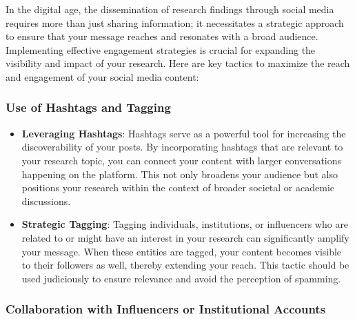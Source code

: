 \documentclass[
]{book}
\begin{document}
In the digital age, the dissemination of research findings through social media requires more than just sharing information; it necessitates a strategic approach to ensure that your message reaches and resonates with a broad audience. Implementing effective engagement strategies is crucial for expanding the visibility and impact of your research. Here are key tactics to maximize the reach and engagement of your social media content:

\hypertarget{use-of-hashtags-and-tagging}{%
\subsubsection*{Use of Hashtags and Tagging}\label{use-of-hashtags-and-tagging}}

\begin{itemize}
\item
  \textbf{Leveraging Hashtags}: Hashtags serve as a powerful tool for increasing the discoverability of your posts. By incorporating hashtags that are relevant to your research topic, you can connect your content with larger conversations happening on the platform. This not only broadens your audience but also positions your research within the context of broader societal or academic discussions.
\item
  \textbf{Strategic Tagging}: Tagging individuals, institutions, or influencers who are related to or might have an interest in your research can significantly amplify your message. When these entities are tagged, your content becomes visible to their followers as well, thereby extending your reach. This tactic should be used judiciously to ensure relevance and avoid the perception of spamming.
\end{itemize}

\hypertarget{collaboration-with-influencers-or-institutional-accounts}{%
\subsubsection*{Collaboration with Influencers or Institutional Accounts}\label{collaboration-with-influencers-or-institutional-accounts}}
\end{document}
